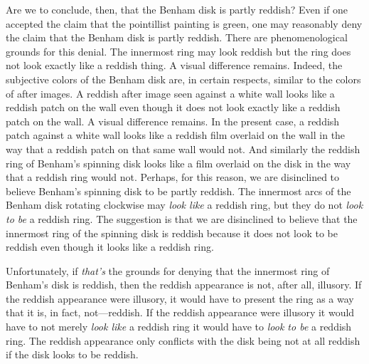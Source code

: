 \documentclass[12pt]{article}
\begin{document}
Are we to conclude, then, that the Benham disk is partly reddish? Even if one accepted the claim that the pointillist painting is green, one may reasonably deny the claim that the Benham disk is partly reddish. There are phenomenological grounds for this denial. The innermost ring may look reddish but the ring does not look exactly like a reddish thing. A visual difference remains. Indeed, the subjective colors of the Benham disk are, in certain respects, similar to the colors of after images. A reddish after image seen against a white wall looks like a reddish patch on the wall even though it does not look exactly like a reddish patch on the wall. A visual difference remains. %
In the present case, a reddish patch against a white wall looks like a reddish film overlaid on the wall in the way that a reddish patch on that same wall would not. And similarly the reddish ring of Benham's spinning disk looks like a film overlaid on the disk in the way that a reddish ring would not. Perhaps, for this reason, we are disinclined to believe Benham's spinning disk to be partly reddish. The innermost arcs of the Benham disk rotating clockwise may \emph{look like} a reddish ring, but they do not \emph{look to be} a reddish ring. The suggestion is that we are disinclined to believe that the innermost ring of the spinning disk is reddish because it does not look to be reddish even though it looks like a reddish ring.

Unfortunately, if \emph{that's} the grounds for denying that the innermost ring of Benham's disk is reddish, then the reddish appearance is not, after all, illusory. If the reddish appearance were illusory, it would have to present the ring as a way that it is, in fact, not---reddish. If the reddish appearance were illusory it would have to not merely \emph{look like} a reddish ring it would have to \emph{look to be} a reddish ring. The reddish appearance only conflicts with the disk being not at all reddish if the disk looks to be reddish.
\end{document}
